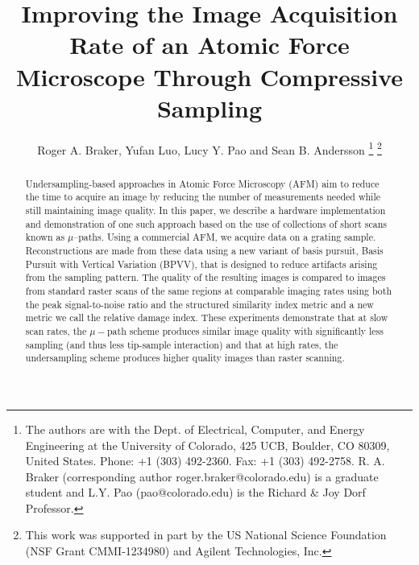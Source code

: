 \documentclass[twocolumn,oneside]{IEEEtran/IEEEtran}
\begin{document}
\title{Improving the Image Acquisition Rate of an Atomic Force
  Microscope Through Compressive Sampling}

\author{Roger A. Braker, Yufan Luo, Lucy Y. Pao and Sean B. Andersson
  \thanks{The authors are with the Dept. of Electrical, Computer, and
    Energy Engineering at the University of Colorado, 425 UCB,
    Boulder, CO 80309, United States. Phone: +1 (303) 492-2360. Fax:
    +1 (303) 492-2758. R. A. Braker (corresponding author
    roger.braker@colorado.edu) is a graduate student and L.Y. Pao
    (pao@colorado.edu) is the Richard \& Joy Dorf Professor.}
  \thanks{This work was supported in part by the US National Science
    Foundation (NSF Grant CMMI-1234980) and Agilent Technologies,
    Inc.} }

\maketitle
\begin{abstract}
  Undersampling-based approaches in Atomic Force Microscopy (AFM) aim
  to reduce the time to acquire an image by reducing the number of
  measurements needed while still maintaining image quality. In this
  paper, we describe a hardware implementation and demonstration of
  one such approach based on the use of collections of short scans
  known as $\mu$--paths. Using a commercial AFM, we acquire data on a
  grating sample. Reconstructions are made from these data using
  a new variant of basis pursuit, Basis Pursuit with Vertical
  Variation (BPVV), that is designed to reduce artifacts arising from
  the sampling pattern. The quality of the resulting images is
  compared to images from standard raster scans of the same regions at
  comparable imaging rates using both the peak signal-to-noise ratio
  and the structured similarity index metric and a new metric we call
  the relative damage index.  These experiments demonstrate that at slow scan
  rates, the $\mu-$path scheme produces similar image quality with
  significantly less sampling (and thus less tip-sample interaction)
  and that at high rates, the undersampling scheme produces higher
  quality images than raster scanning.
\end{abstract}
\end{document}
